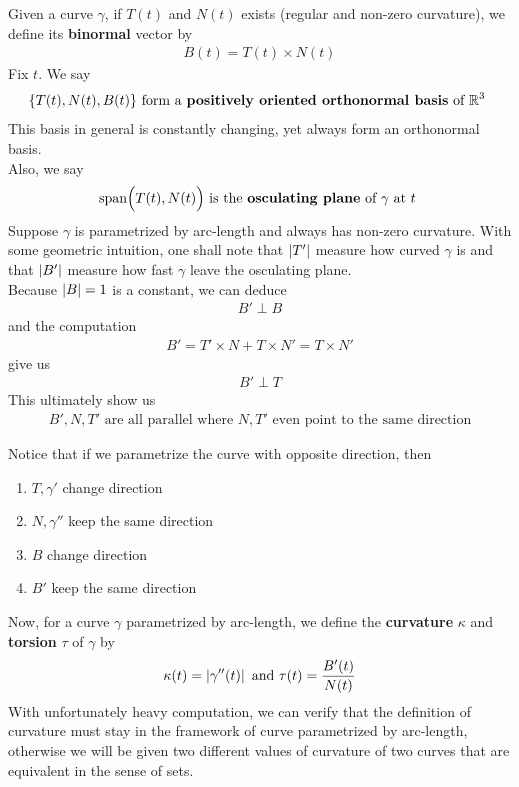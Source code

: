 \documentclass{report}
\begin{document}
\begin{mdframed}
Given a curve $\gamma $, if $T(t)$ and $N(t)$ exists (regular and non-zero curvature), we define its \textbf{binormal} vector by 
\begin{align*}
B(t)=T(t) \times N(t)
\end{align*}
Fix $t$. We say 
\begin{align*}
\{ T(t),N(t),B(t) \}\text{ form a \textbf{positively oriented orthonormal basis} of $\mathbb{R}^3$ }
\end{align*}
This basis in general is constantly changing, yet always form an orthonormal basis.\\

Also, we say 
\begin{align*}
\text{span}\Big( T(t),N(t)\Big)\text{ is the \textbf{osculating plane} of $\gamma $ at $t$ }
\end{align*}
Suppose $\gamma $ is parametrized by arc-length and always has non-zero curvature. With some geometric intuition, one shall note that $\left|T'\right|$ measure how curved $\gamma $ is and that $\left|B'\right|$ measure how fast  $\gamma $ leave the osculating plane.\\

Because $\left|B\right|=1$ is a constant, we can deduce  
\begin{align*}
B'\perp B
\end{align*}
and the computation 
\begin{align*}
B'=T' \times N + T \times N'=T \times N' 
\end{align*}
give us 
\begin{align*}
B'\perp T
\end{align*}
This ultimately show us 
\begin{align*}
B',N,T'\text{ are all parallel where $N,T'$ even point to the same direction}
\end{align*}


Notice that if we parametrize the curve with opposite direction, then 
\begin{enumerate}[label=(\alph*)]
  \item $T,\gamma '$ change direction 
  \item $N,\gamma ''$ keep the same direction 
  \item $B$ change direction 
  \item $B'$ keep the same direction 
\end{enumerate}
Now, for a curve $\gamma $ parametrized by arc-length, we define the \textbf{curvature} $\kappa$ and \textbf{torsion} $\tau$ of $\gamma $ by 
\begin{align*}
\kappa(t)=\left|\gamma ''(t)\right|\text{ and }\tau (t)=\frac{B'(t)}{N(t)}
\end{align*}
With unfortunately heavy computation, we can verify that the definition of curvature must stay in the framework of curve parametrized by arc-length, otherwise we will be given two different values of curvature of two curves that are equivalent in the sense of sets.\\


\end{mdframed}
\end{document}

